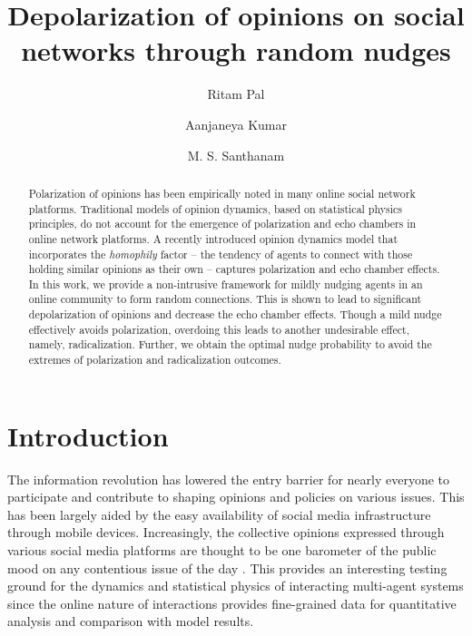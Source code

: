 \documentclass[%
 reprint,
superscriptaddress,
 amsmath,amssymb,
 aps,
 pre,
]{revtex4-1}
\begin{document}
\newcommand{\red}{\textcolor{red}}
\newcommand{\blue}{\textcolor{blue}}

\title[sample title]{Depolarization of opinions on social networks through random nudges}
\author{Ritam Pal}
\author{Aanjaneya Kumar}
\author{M. S. Santhanam}

\begin{abstract}
Polarization of opinions has been empirically noted in many online social network platforms. Traditional models of opinion dynamics, based on statistical physics principles, do not account for the emergence of polarization and echo chambers in online network platforms. A recently introduced opinion dynamics model that incorporates the \emph{homophily} factor -- the tendency of agents to connect with those holding similar opinions as their own -- captures polarization and echo chamber effects. In this work, we provide a non-intrusive framework for mildly nudging agents in an online community to form random connections. This is shown to lead to significant depolarization of opinions and decrease the echo chamber effects. Though a mild nudge effectively avoids polarization, overdoing this leads to another undesirable effect, namely, radicalization. Further, we obtain the optimal nudge probability to avoid the extremes of polarization and radicalization outcomes.
\end{abstract}

\maketitle




\section{Introduction}
The information revolution has lowered the entry barrier for nearly everyone to participate and contribute to shaping opinions and policies on various issues. This has been largely aided by the easy availability of social media infrastructure through mobile devices. Increasingly, the collective opinions expressed through various social media platforms are thought to be one barometer of the public mood on any contentious issue of the day \cite{social-media-as-public-opinion}. This provides an interesting testing ground for the dynamics and statistical physics of interacting multi-agent systems since the online nature of interactions provides fine-grained data for quantitative analysis and comparison with model results.
\end{document}
